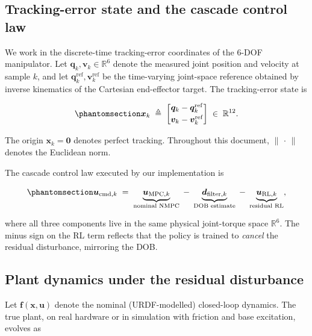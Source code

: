 \documentclass[
  11pt,
]{article}
\theoremstyle{plain}
\theoremstyle{plain}
\theoremstyle{definition}
\theoremstyle{remark}
\begin{document}
\subsection{Tracking-error state and the cascade control
law}\label{tracking-error-state-and-the-cascade-control-law}

We work in the discrete-time tracking-error coordinates of the 6-DOF
manipulator. Let \(\bm{q}_k,\bm{v}_k \in \mathbb{R}^6\) denote the
measured joint position and velocity at sample \(k\), and let
\(\bm{q}^{\mathrm{ref}}_k,\bm{v}^{\mathrm{ref}}_k\) be the time-varying
joint-space reference obtained by inverse kinematics of the Cartesian
end-effector target. The tracking-error state is

\begin{equation}\protect\phantomsection\label{eq-state}{
\bm{x}_k \;\triangleq\;
\begin{bmatrix}
\bm{q}_k - \bm{q}^{\mathrm{ref}}_k \\[2pt]
\bm{v}_k - \bm{v}^{\mathrm{ref}}_k
\end{bmatrix}
\;\in\; \mathbb{R}^{12}.
}\end{equation}

The origin \(\bm{x}_k = \bm{0}\) denotes perfect tracking. Throughout
this document, \(\|\,\cdot\,\|\) denotes the Euclidean norm.

The cascade control law executed by our implementation is

\begin{equation}\protect\phantomsection\label{eq-cmd}{
\bm{u}_{\mathrm{cmd},k}
\;=\;
\underbrace{\bm{u}_{\mathrm{MPC},k}}_{\text{nominal NMPC}}
\;-\;
\underbrace{\bm{d}_{\mathrm{filter},k}}_{\text{DOB estimate}}
\;-\;
\underbrace{\bm{u}_{\mathrm{RL},k}}_{\text{residual RL}},
}\end{equation}

where all three components live in the same physical joint-torque space
\(\mathbb{R}^6\). The minus sign on the RL term reflects that the policy
is trained to \emph{cancel} the residual disturbance, mirroring the DOB.

\subsection{Plant dynamics under the residual
disturbance}\label{plant-dynamics-under-the-residual-disturbance}

Let \(\bm{f}(\bm{x},\bm{u})\) denote the nominal (URDF-modelled)
closed-loop dynamics. The true plant, on real hardware or in simulation
with friction and base excitation, evolves as
\end{document}
